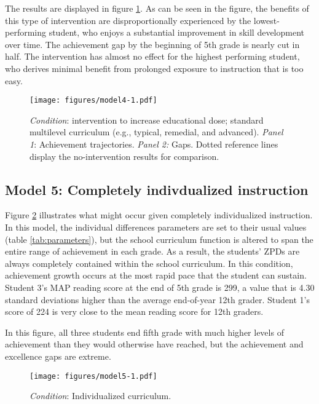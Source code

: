 \documentclass[english,floatsintext,jou]{apa6}
\theoremstyle{definition}
\theoremstyle{definition}
\theoremstyle{definition}
\theoremstyle{remark}
\begin{document}
The results are displayed in figure \ref{fig:model4}. As can be seen in
the figure, the benefits of this type of intervention are
disproportionally experienced by the lowest-performing student, who
enjoys a substantial improvement in skill development over time. The
achievement gap by the beginning of 5th grade is nearly cut in half. The
intervention has almost no effect for the highest performing student,
who derives minimal benefit from prolonged exposure to instruction that
is too easy.

\begin{figure}[htbp]
\centering
\texttt{[image: figures/model4-1.pdf]}
\caption{\label{fig:model4}\emph{Condition}: intervention to increase
educational dose; standard multilevel curriculum (e.g., typical,
remedial, and advanced). \emph{Panel 1}: Achievement trajectories.
\emph{Panel 2:} Gaps. Dotted reference lines display the no-intervention
results for comparison.}
\end{figure}

\subsection{Model 5: Completely indivdualized
instruction}\label{model-5-completely-indivdualized-instruction}

Figure \ref{fig:model5} illustrates what might occur given completely
individualized instruction. In this model, the individual differences
parameters are set to their usual values (table \ref{tab:parameters}),
but the school curriculum function is altered to span the entire range
of achievement in each grade. As a result, the students' ZPDs are always
completely contained within the school curriculum. In this condition,
achievement growth occurs at the most rapid pace that the student can
sustain. Student 3's MAP reading score at the end of 5th grade is 299, a
value that is 4.30 standard deviations higher than the average
end-of-year 12th grader. Student 1's score of 224 is very close to the
mean reading score for 12th graders.

In this figure, all three students end fifth grade with much higher
levels of achievement than they would otherwise have reached, but the
achievement and excellence gaps are extreme.

\begin{figure}[htbp]
\centering
\texttt{[image: figures/model5-1.pdf]}
\caption{\label{fig:model5}\emph{Condition}: Individualized curriculum.}
\end{figure}
\end{document}
